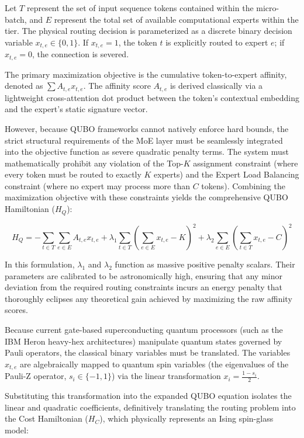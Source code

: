 \documentclass[11pt,a4paper]{article}
\begin{document}
Let $T$ represent the set of input sequence tokens contained within the micro-batch, and $E$ represent the total set of available computational experts within the tier. The physical routing decision is parameterized as a discrete binary decision variable $x_{t,e} \in \{0, 1\}$. If $x_{t,e} = 1$, the token $t$ is explicitly routed to expert $e$; if $x_{t,e} = 0$, the connection is severed.

The primary maximization objective is the cumulative token-to-expert affinity, denoted as $\sum A_{t,e} x_{t,e}$. The affinity score $A_{t,e}$ is derived classically via a lightweight cross-attention dot product between the token's contextual embedding and the expert's static signature vector.

However, because QUBO frameworks cannot natively enforce hard bounds, the strict structural requirements of the MoE layer must be seamlessly integrated into the objective function as severe quadratic penalty terms. The system must mathematically prohibit any violation of the Top-$K$ assignment constraint (where every token must be routed to exactly $K$ experts) and the Expert Load Balancing constraint (where no expert may process more than $C$ tokens). Combining the maximization objective with these constraints yields the comprehensive QUBO Hamiltonian ($H_Q$):

$$H_Q = -\sum_{t \in T} \sum_{e \in E} A_{t,e} x_{t,e} + \lambda_1 \sum_{t \in T} \left( \sum_{e \in E} x_{t,e} - K \right)^2 + \lambda_2 \sum_{e \in E} \left( \sum_{t \in T} x_{t,e} - C \right)^2$$

In this formulation, $\lambda_1$ and $\lambda_2$ function as massive positive penalty scalars. Their parameters are calibrated to be astronomically high, ensuring that any minor deviation from the required routing constraints incurs an energy penalty that thoroughly eclipses any theoretical gain achieved by maximizing the raw affinity scores.

Because current gate-based superconducting quantum processors (such as the IBM Heron heavy-hex architectures) manipulate quantum states governed by Pauli operators, the classical binary variables must be translated. The variables $x_{t,e}$ are algebraically mapped to quantum spin variables (the eigenvalues of the Pauli-Z operator, $s_i \in \{-1, 1\}$) via the linear transformation $x_i = \frac{1 - s_i}{2}$.

Substituting this transformation into the expanded QUBO equation isolates the linear and quadratic coefficients, definitively translating the routing problem into the Cost Hamiltonian ($H_C$), which physically represents an Ising spin-glass model:
\end{document}
